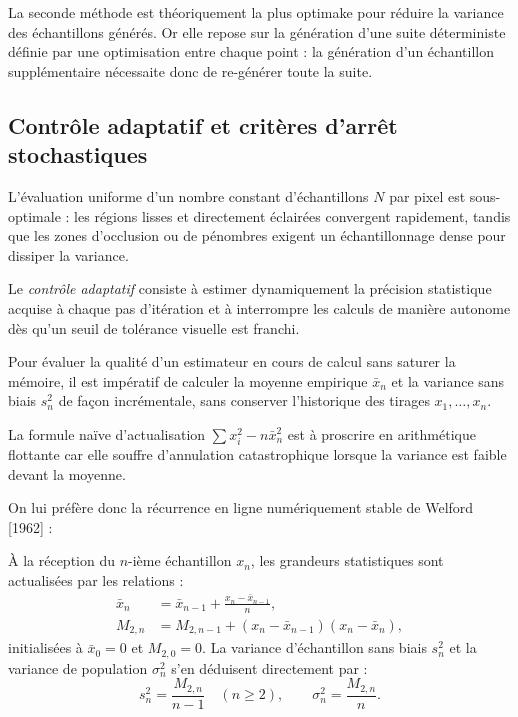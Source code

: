 \begin{remark}[Limites]
    La seconde méthode est théoriquement la plus optimake pour réduire la variance des échantillons générés. Or elle repose sur la génération d'une suite déterministe définie par une optimisation entre chaque point : la génération d'un échantillon supplémentaire nécessaite donc de re-générer toute la suite. 
\end{remark}

\subsection{Contrôle adaptatif et critères d'arrêt stochastiques}

L'évaluation uniforme d'un nombre constant d'échantillons $N$ par pixel est sous-optimale : les régions lisses et directement éclairées convergent rapidement, tandis que les zones d'occlusion ou de pénombres exigent un échantillonnage dense pour dissiper la variance. 

Le \emph{contrôle adaptatif} consiste à estimer dynamiquement la précision statistique acquise à chaque pas d'itération et à interrompre les calculs de manière autonome dès qu'un seuil de tolérance visuelle est franchi.

\begin{remark}
    Pour évaluer la qualité d'un estimateur en cours de calcul sans saturer la mémoire, il est impératif de calculer la moyenne empirique $\bar{x}_n$ et la variance sans biais $s_n^2$ de façon incrémentale, sans conserver l'historique des tirages $x_1, \dots, x_n$.

    La formule naïve d'actualisation $\sum x_i^2 - n \bar{x}_n^2$ est à proscrire en arithmétique flottante car elle souffre d'annulation catastrophique lorsque la variance est faible devant la moyenne.
\end{remark}

On lui préfère donc la récurrence en ligne numériquement stable de Welford [1962] :

\begin{proposition}
    À la réception du $n$-ième échantillon $x_n$, les grandeurs statistiques sont actualisées par les relations :
    \begin{align}
        \bar{x}_n &= \bar{x}_{n-1} + \frac{x_n - \bar{x}_{n-1}}{n}, \label{eq:welford_mean} \\
        M_{2,n} &= M_{2,n-1} + (x_n - \bar{x}_{n-1})(x_n - \bar{x}_n), \label{eq:welford_m2}
    \end{align}
    initialisées à $\bar{x}_0 = 0$ et $M_{2,0} = 0$.
    La variance d'échantillon sans biais $s_n^2$ et la variance de population $\sigma_n^2$ s'en déduisent directement par :
    \begin{equation}
        s_n^2 = \frac{M_{2,n}}{n-1} \quad (n \geqslant 2), \qquad \sigma_n^2 = \frac{M_{2,n}}{n}.
    \end{equation}
\end{proposition}

